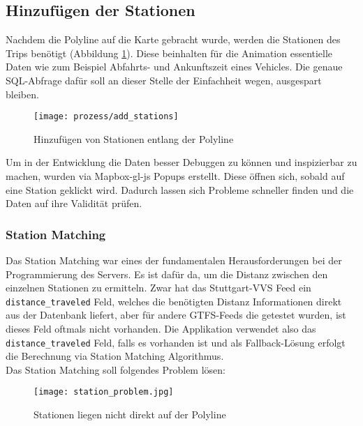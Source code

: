 \subsection{Hinzufügen der Stationen}
\label{sub:hinzufügen_der_stationen}
  Nachdem die Polyline auf die Karte gebracht wurde, werden die Stationen des Trips benötigt (Abbildung \ref{fig:prozess/add_stations}). Diese beinhalten für die Animation essentielle Daten wie zum Beispiel Abfahrts- und Ankunftszeit eines Vehicles. Die genaue SQL-Abfrage dafür soll an dieser Stelle der Einfachheit wegen, ausgespart bleiben.\\

  \begin{figure}[htbp]
    \begin{center}
      \texttt{[image: prozess/add\_stations]}
      \caption{Hinzufügen von Stationen entlang der Polyline}
      \label{fig:prozess/add_stations}
    \end{center}
  \end{figure}

  Um in der Entwicklung die Daten besser Debuggen zu können und inspizierbar zu machen, wurden via Mapbox-gl-js Popups erstellt. Diese öffnen sich, sobald auf eine Station geklickt wird. Dadurch lassen sich Probleme schneller finden und die Daten auf ihre Validität prüfen.

  \subsubsection{Station Matching}
  \label{ssub:station_matching}
    Das Station Matching war eines der fundamentalen Herausforderungen bei der Programmierung des Servers. Es ist dafür da, um die Distanz zwischen den einzelnen Stationen zu ermitteln. Zwar hat das Stuttgart-VVS Feed ein \texttt{distance\_traveled} Feld, welches die benötigten Distanz Informationen direkt aus der Datenbank liefert, aber für andere GTFS-Feeds die getestet wurden, ist dieses Feld oftmals nicht vorhanden. Die Applikation verwendet also das \texttt{distance\_traveled} Feld, falls es vorhanden ist und als Fallback-Lösung erfolgt die Berechnung via Station Matching Algorithmus.\\

    Das Station Matching soll folgendes Problem lösen:

    \begin{figure}[htbp]
      \begin{center}
        \texttt{[image: station\_problem.jpg]}
        \caption{Stationen liegen nicht direkt auf der Polyline}
        \label{fig:station_problem}
      \end{center}
    \end{figure}
    
